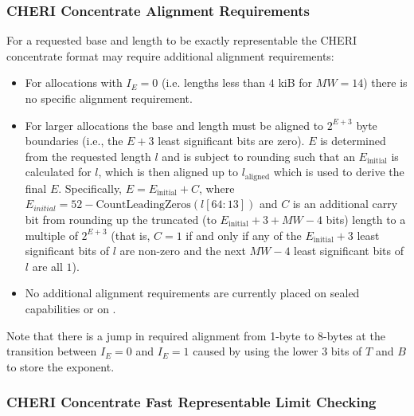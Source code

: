 \subsubsection{CHERI Concentrate Alignment Requirements}
\label{sec:ccalignment}
For a requested base and length to be exactly representable the CHERI concentrate format may require additional alignment requirements:
\begin{itemize}
\item
  For allocations with $I_E = 0$ (i.e. lengths less than $4$ kiB for $MW = 14$) there is no specific alignment requirement.

\item
  For larger allocations the base and length must be aligned to $2^{E+3}$ byte
  boundaries (i.e., the $E + 3$ least significant bits are zero).
  $E$ is determined from the requested length $l$ and is subject to rounding such that an
  $E_{\text{initial}}$ is calculated for $l$, which is then aligned up to $l_{\text{aligned}}$ which is used to derive
  the final $E$.
  Specifically, $E = E_{\text{initial}} + C$, where $E_{initial} = 52 - \text{CountLeadingZeros}(l[64:13])$
  and $C$ is an additional carry
  bit from rounding up the truncated (to $E_{\text{initial}} + 3 + MW - 4$ bits) length to a
  multiple of $2^{E+3}$ (that is, $C = 1$ if and only if any of the $E_{\text{initial}} + 3$
  least significant bits of $l$ are non-zero and the next $MW - 4$ least
  significant bits of $l$ are all $1$).

\item
  No additional alignment requirements are currently placed on sealed capabilities or on \DDC{}.
\end{itemize}
Note that there is a jump in required alignment from 1-byte to 8-bytes at the transition between $I_E = 0$ and $I_E = 1$ caused by using the lower 3 bits of $T$ and $B$ to store the exponent.

\subsubsection{CHERI Concentrate Fast Representable Limit Checking}
\label{sec:cheri-concentrate-fast-representable-limit-checking}
%
%

